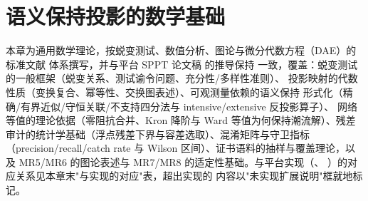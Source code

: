 
\section{语义保持投影的数学基础}\label{sec:sp-th-foundations}

\begin{theorynote}
本章为通用数学理论，按蜕变测试、数值分析、图论与微分代数方程（DAE）的标准文献
体系撰写，并与平台 SPPT 论文稿  的推导保持
一致，覆盖：蜕变测试的一般框架（蜕变关系、测试谕令问题、充分性/多样性准则）、
投影映射的代数性质（变换复合、幂等性、交换图表述）、可观测量依赖的语义保持
形式化（精确/有界近似/守恒关联/不支持四分法与 intensive/extensive 反投影算子）、
网络等值的理论依据（零阻抗合并、Kron 降阶与 Ward 等值为何保持潮流解）、残差
审计的统计学基础（浮点残差下界与容差选取）、混淆矩阵与守卫指标
（precision/recall/catch rate 与 Wilson 区间）、证书语料的抽样与覆盖理论，以及
MR5/MR6 的图论表述与 MR7/MR8 的适定性基础。与平台实现（、
）的对应关系见本章末"与实现的对应"表，超出实现的
内容以"未实现扩展说明"框就地标记。
\end{theorynote}


